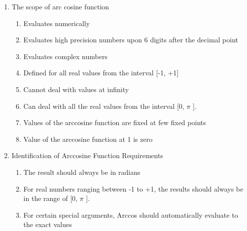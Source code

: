 \documentclass[12pt]{article}
\begin{document}
\begin{enumerate}
	\item The scope of arc cosine function\par

\begin{enumerate}
	\item Evaluates numerically\par

	\item Evaluates high precision numbers upon 6 digits after the decimal point\par

	\item Evaluates complex numbers\par

	\item Defined for all real values from the interval [-1, +1]\par

	\item Cannot deal with values at infinity\par

	\item Can deal with all the real values from the interval [0, $ \pi $ ].\par

	\item Values of the arccosine function are fixed at few fixed points\par

	\item Value of the arccosine function at 1 is zero
\end{enumerate}\par


\vspace{\baselineskip}
	\item Identification of Arccosine Function Requirements\par

\begin{enumerate}
	\item The result should always be in radians\par

	\item For real numbers ranging between -1 to +1, the results should always be in the range of [0, $ \pi $ ].\par

	\item For certain special arguments, Arccos should automatically evaluate to the exact values\par


\end{enumerate}
\end{enumerate}
\end{document}
